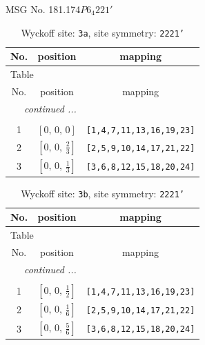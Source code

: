\documentclass[fleqn,8pt]{jsarticle}
\begin{document}
\setcounter{MaxMatrixCols}{32}

\renewcommand{\tablename}{Table~}
\renewcommand{\figurename}{Figure~}
\begin{center}
\LARGE
MSG No. 181.174\quad$P6_{4}221'$
\end{center}
\renewcommand{\arraystretch}{1.2}
\begin{longtable}{ccc}
\caption{Wyckoff site: {\tt 3a}, site symmetry: {\tt 2221'}}
 \\
 \hline \hline
No. & position & mapping \\ \hline \endfirsthead

\multicolumn{2}{l}{\tablename\ \thetable{}} \\
 \hline \hline
No. & position & mapping \\ \hline \endhead

 \hline \hline
\multicolumn{2}{r}{\footnotesize\it continued ...} \\ \endfoot

 \hline \hline
\multicolumn{2}{r}{} \\ \endlastfoot

1 & $\left[ 0,\, 0,\, 0 \right]$ & {\tt [1,4,7,11,13,16,19,23]} \\ \hline
2 & $\left[ 0,\, 0,\, \frac{2}{3} \right]$ & {\tt [2,5,9,10,14,17,21,22]} \\ \hline
3 & $\left[ 0,\, 0,\, \frac{1}{3} \right]$ & {\tt [3,6,8,12,15,18,20,24]} \\
\end{longtable}
\renewcommand{\arraystretch}{1.2}
\begin{longtable}{ccc}
\caption{Wyckoff site: {\tt 3b}, site symmetry: {\tt 2221'}}
 \\
 \hline \hline
No. & position & mapping \\ \hline \endfirsthead

\multicolumn{2}{l}{\tablename\ \thetable{}} \\
 \hline \hline
No. & position & mapping \\ \hline \endhead

 \hline \hline
\multicolumn{2}{r}{\footnotesize\it continued ...} \\ \endfoot

 \hline \hline
\multicolumn{2}{r}{} \\ \endlastfoot

1 & $\left[ 0,\, 0,\, \frac{1}{2} \right]$ & {\tt [1,4,7,11,13,16,19,23]} \\ \hline
2 & $\left[ 0,\, 0,\, \frac{1}{6} \right]$ & {\tt [2,5,9,10,14,17,21,22]} \\ \hline
3 & $\left[ 0,\, 0,\, \frac{5}{6} \right]$ & {\tt [3,6,8,12,15,18,20,24]} \\
\end{longtable}
\end{document}
